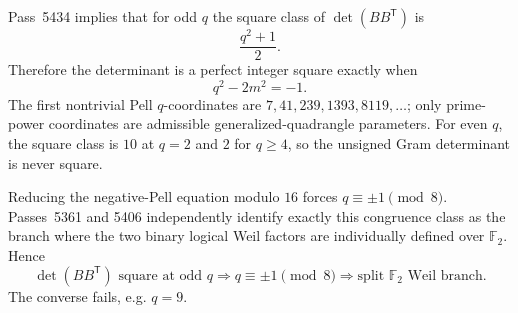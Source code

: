 Pass~5434 implies that for odd $q$ the square class of
$\det(BB^{\mathsf T})$ is
\[
 \boxed{\frac{q^2+1}{2}}.
\]
Therefore the determinant is a perfect integer square exactly when
\[
 \boxed{q^2-2m^2=-1.}
\]
The first nontrivial Pell $q$-coordinates are $7,41,239,1393,8119,\ldots$;
only prime-power coordinates are admissible generalized-quadrangle parameters.
For even $q$, the square class is $10$ at $q=2$ and $2$ for $q\ge4$, so the
unsigned Gram determinant is never square.

Reducing the negative-Pell equation modulo $16$ forces $q\equiv\pm1\pmod8$.
Passes~5361 and 5406 independently identify exactly this congruence class as the
branch where the two binary logical Weil factors are individually defined over
$\mathbb F_2$.  Hence
\[
 \boxed{
 \det(BB^{\mathsf T})\text{ square at odd }q
 \Longrightarrow q\equiv\pm1\pmod8
 \Longrightarrow \text{split }\mathbb F_2\text{ Weil branch}.
 }
\]
The converse fails, e.g. $q=9$.
